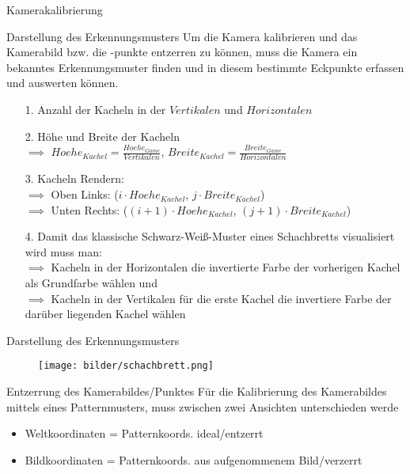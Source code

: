 \begin{frame}{Kamerakalibrierung}
\end{frame}

\begin{frame}{Darstellung des Erkennungsmusters}
	Um die Kamera kalibrieren und das Kamerabild bzw. die -punkte entzerren zu können, muss die Kamera ein bekanntes Erkennungsmuster finden und in diesem bestimmte Eckpunkte erfassen und auswerten können.
	\pause
	\begin{itemize}
		\item[1.] Anzahl der Kacheln in der $Vertikalen$ und $Horizontalen$
		\item[2.] Höhe und Breite der Kacheln\\
		\pause
		$\implies$ $Hoehe_{Kachel} = \frac{Hoehe_{Game}}{Vertikalen}$, $Breite_{Kachel} = \frac{Breite_{Game}}{Horizontalen}$\\
		\pause
		\item[3.] Kacheln Rendern:\\
				$\implies$ Oben Links: ($i \cdot Hoehe_{Kachel}$, $j \cdot Breite_{Kachel}$)\\
				$\implies$ Unten Rechts: ($(i+1) \cdot Hoehe_{Kachel}$, $(j+1) \cdot Breite_{Kachel}$)\\
		\pause
		\item[4.] Damit das klassische Schwarz-Weiß-Muster eines Schachbretts visualisiert wird muss man:\\
		$\implies$ Kacheln in der Horizontalen die invertierte Farbe der vorherigen Kachel als Grundfarbe wählen und \\
		$\implies$ Kacheln in der Vertikalen für die erste Kachel die invertiere Farbe der darüber liegenden Kachel wählen
	\end{itemize}
\end{frame}
\begin{frame}{Darstellung des Erkennungsmusters}
	\begin{figure}[h]
		\centering
		\texttt{[image: bilder/schachbrett.png]}
	\end{figure}

\end{frame}


\begin{frame}{Entzerrung des Kamerabildes/Punktes}
Für die Kalibrierung des Kamerabildes mittels eines Patternmusters, muss zwischen zwei Ansichten unterschieden werde
	\begin{itemize}
		\item Weltkoordinaten = Patternkoords. ideal/entzerrt
		\item Bildkoordinaten = Patternkoords. aus aufgenommenem Bild/verzerrt
	\end{itemize}
\end{frame}

